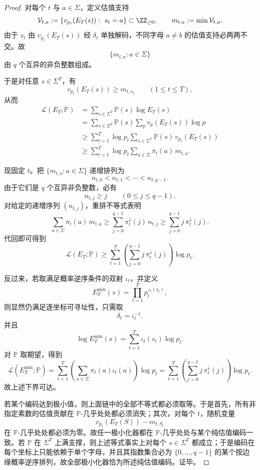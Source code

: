 \begin{proof}
对每个 \(t\) 与 \(a\in\Sigma\)，定义估值支持
\[
\mathcal V_{t,a}:=
\{v_{p_t}(E_T(s)):\ s_t=a\}\subset \ZZ_{\ge 0},
\qquad
m_{t,a}:=\min \mathcal V_{t,a}.
\]
由于 \(s_t\) 由 \(v_{p_t}(E_T(s))\) 经 \(\delta_t\) 单独解码，不同字母 \(a\neq b\) 的估值支持必两两不交。故
\[
\{m_{t,a}:a\in\Sigma\}
\]
由 \(q\) 个互异的非负整数组成。

于是对任意 \(s\in\Sigma^T\)，有
\[
v_{p_t}(E_T(s))\ge m_{t,s_t}
\qquad (1\le t\le T),
\]
从而
\[
\begin{aligned}
\mathcal L(E_T;\mathbb P)
&=
\sum_{s\in\Sigma^T}\mathbb P(s)\log E_T(s)\\
&=
\sum_{s\in\Sigma^T}\mathbb P(s)\sum_{p}v_p(E_T(s))\log p\\
&\ge
\sum_{t=1}^{T}\log p_t
\sum_{s\in\Sigma^T}\mathbb P(s)\,v_{p_t}(E_T(s))\\
&\ge
\sum_{t=1}^{T}\log p_t
\sum_{a\in\Sigma}\pi_t(a)\,m_{t,a}.
\end{aligned}
\]

现固定 \(t\)。把 \(\{m_{t,a}:a\in\Sigma\}\) 递增排列为
\[
n_{t,0}<n_{t,1}<\cdots <n_{t,q-1}.
\]
由于它们是 \(q\) 个互异非负整数，必有
\[
n_{t,j}\ge j
\qquad (0\le j\le q-1).
\]
对给定的递增序列 \((n_{t,j})\)，重排不等式表明
\[
\sum_{a\in\Sigma}\pi_t(a)\,m_{t,a}
\ge
\sum_{j=0}^{q-1}\pi_t^\downarrow(j)\,n_{t,j}
\ge
\sum_{j=0}^{q-1}j\,\pi_t^\downarrow(j).
\]
代回即可得到
\[
\mathcal L(E_T;\mathbb P)
\ge
\sum_{t=1}^{T}
\left(
\sum_{j=0}^{q-1}j\,\pi_t^\downarrow(j)
\right)\log p_t.
\]

反过来，若取满足概率逆序条件的双射 \(\iota_t\)，并定义
\[
E_T^{\min}(s)=\prod_{t=1}^{T}p_t^{\,\iota_t(s_t)},
\]
则显然仍满足逐坐标可寻址性，只需取
\[
\delta_t=\iota_t^{-1}.
\]
并且
\[
\log E_T^{\min}(s)=\sum_{t=1}^{T}\iota_t(s_t)\log p_t.
\]
对 \(\mathbb P\) 取期望，得到
\[
\mathcal L(E_T^{\min};\mathbb P)
=
\sum_{t=1}^{T}
\left(
\sum_{a\in\Sigma}\pi_t(a)\iota_t(a)
\right)\log p_t
=
\sum_{t=1}^{T}
\left(
\sum_{j=0}^{q-1}j\,\pi_t^\downarrow(j)
\right)\log p_t.
\]
故上述下界可达。

若某个编码达到极小值，则上面链中的全部不等式都必须取等。于是首先，所有非指定素数的估值贡献在 \(\mathbb P\)-几乎处处都必须消失；其次，对每个 \(t\)，随机变量
\[
v_{p_t}(E_T(S))-m_{t,S_t}
\]
在 \(\mathbb P\)-几乎处处都必须为零。故任一极小化器都在 \(\mathbb P\)-几乎处处与某个纯估值编码一致。若 \(\mathbb P\) 在 \(\Sigma^T\) 上满支撑，则上述等式事实上对每个 \(s\in\Sigma^T\) 都成立；于是编码在每个坐标上只能依赖于单个字母，并且其指数集合必为 \(\{0,\dots,q-1\}\) 的某个按边缘概率逆序排列，故全部极小化器恰为所述纯估值编码。证毕。
\end{proof}

